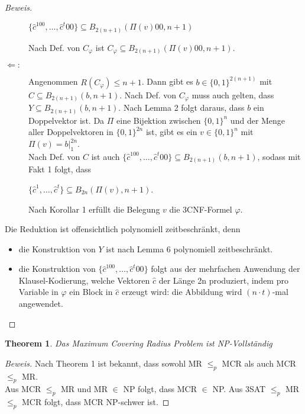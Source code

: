 \documentclass[11pt]{article}
\newtheorem{theorem}{Theorem}
\theoremstyle{break}
\theoremstyle{norm}
\begin{document}
\begin{proof}[Beweis]
\begin{description}
\begin{center}
     $\{\hat{c}^100,\ldots,\hat{c}^t00\}\subseteq B_{2(n+1)}(\Pi(v)00,n+1)$
\end{center}
Nach Def. von $C_\varphi$ ist $C_\varphi \subseteq  B_{2(n+1)}(\Pi(v)00,n+1)$.
\item[$\Leftarrow:$] Angenommen $R(C_\varphi)\leq n+1$.
Dann gibt es $b\in \{0,1\}^{2(n+1)}$ mit $C\subseteq B_{2(n+1)}(b,n+1)$. Nach Def. von $C_\varphi$ muss auch gelten, dass $Y\subseteq  B_{2(n+1)}(b,n+1)$. Nach Lemma 2 folgt daraus, dass $b$ ein Doppelvektor ist. Da $\Pi$ eine Bijektion zwischen $\{0,1\}^n$ und der Menge aller Doppelvektoren in $\{0,1\}^{2n}$ ist, gibt es ein $v \in \{0,1\}^n$ mit $\Pi(v)=b|_1^{2n}$.\\
Nach Def. von $C$ ist auch $\{\hat{c}^100,\ldots,\hat{c}^t00\}\subseteq B_{2(n+1)}(b,n+1)$, sodass mit Fakt 1 folgt, dass
\begin{center}
 $\{\hat{c}^1,\ldots,\hat{c}^t\}\subseteq B_{2n}(\Pi(v),n+1)$.
 \end{center}
 Nach Korollar 1 erfüllt die Belegung $v$ die 3CNF-Formel $\varphi$.
\end{description}
 Die Reduktion ist offensichtlich polynomiell zeitbeschränkt, denn 
 \begin{itemize}
     \item  die Konstruktion von $Y$ ist nach Lemma 6 polynomiell zeitbeschränkt.
     \item die Konstruktion von  $\{\hat{c}^100,\ldots,\hat{c}^t00\}$ folgt aus der mehrfachen Anwendung der Klausel-Kodierung, welche Vektoren $\hat{c}$ der Länge 2n produziert, indem pro Variable in $\varphi$ ein Block in $\hat{c}$ erzeugt wird: die Abbildung wird $(n\cdot t)$-mal angewendet.
 \end{itemize}
\end{proof}
 \begin{theorem}
 Das Maximum Covering Radius Problem ist NP-Vollständig
 \end{theorem}
 \begin{proof}[Beweis]
     Nach Theorem 1 ist bekannt, dass sowohl MR $\leq_p$ MCR als auch MCR $\leq_p$ MR.\\ Aus MCR $\leq_p$ MR und MR $\in$ NP folgt, dass MCR $\in$ NP.
 Aus 3SAT $\leq_p$ MR $\leq_p$ MCR folgt, dass MCR NP-schwer ist. 
 \end{proof}
\end{document}

